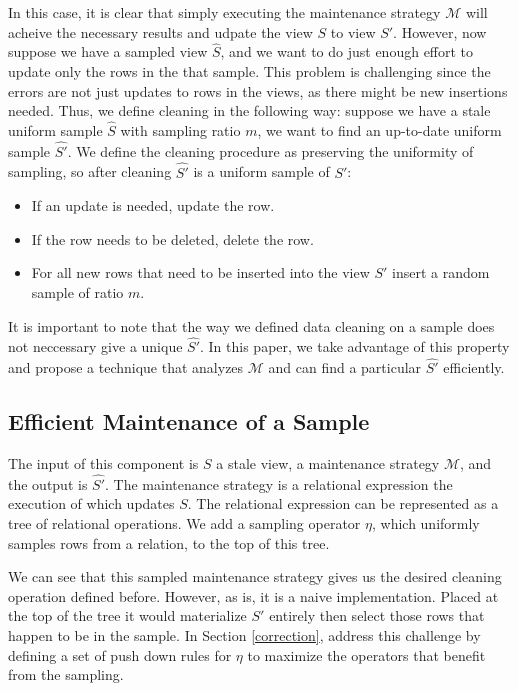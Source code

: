 In this case, it is clear that simply executing the maintenance strategy $\mathcal{M}$ will acheive the necessary results and udpate the view $S$ to view $S'$.
However, now suppose we have a sampled view $\hat{S}$, and we want to do just enough effort to update only the rows in the that sample.
This problem is challenging since the errors are not just updates to rows in the views, as there might be new insertions needed.
Thus, we define cleaning in the following way: suppose we have a stale uniform sample $\hat{S}$ with sampling ratio $m$, we want to find an up-to-date uniform sample $\hat{S'}$.
We define the cleaning procedure as preserving the uniformity of sampling, so after cleaning $\hat{S'}$ is a uniform sample of $S'$:
\begin{itemize}
\item If an update is needed, update the row.
\item If the row needs to be deleted, delete the row.
\item For all new rows that need to be inserted into the view $S'$ insert a random sample of ratio $m$.
\end{itemize}

It is important to note that the way we defined data cleaning on a sample does not neccessary give a unique $\hat{S'}$. 
In this paper, we take advantage of this property and propose a technique that analyzes $\mathcal{M}$ and can find a particular $\hat{S'}$
efficiently.

\subsection{Efficient Maintenance of a Sample}
The input of this component is $S$ a stale view, a maintenance strategy $\mathcal{M}$, and the output is $\hat{S'}$.
The maintenance strategy is a relational expression the execution of which updates $S$.
The relational expression can be represented as a tree of relational operations. 
We add a sampling operator $\eta$, which uniformly samples rows from a relation, to the top of this tree.

We can see that this sampled maintenance strategy gives us the desired cleaning operation defined before.
However, as is, it is a naive implementation.
Placed at the top of the tree it would materialize $S'$ entirely then select those rows that happen to be in the sample.
In Section \ref{correction}, address this challenge by defining a set of push down rules for $\eta$ to maximize the operators that benefit from the sampling.

